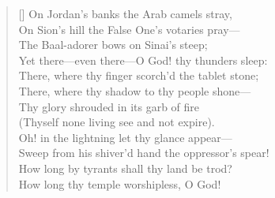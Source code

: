 \clearpage
{}
\begin{verse}[\versewidth]
On Jordan's banks the Arab camels stray,\\
On Sion's hill the False One's votaries pray---\\
The Baal-adorer bows on Sinai's steep;\\
Yet there---even there---O God! thy thunders sleep:\\
\bigskip
There, where thy finger scorch'd the tablet stone;\\
There, where thy shadow to thy people shone---\\
Thy glory shrouded in its garb of fire\\
(Thyself none living see and not expire).\\
\bigskip
Oh! in the lightning let thy glance appear---\\
Sweep from his shiver'd hand the oppressor's spear!\\
How long by tyrants shall thy land be trod?\\
How long thy temple worshipless, O God!\\
\end{verse}



